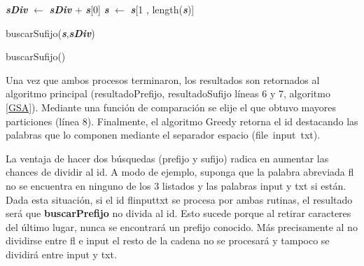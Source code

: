 \begin{function}[b!]
\LinesNumbered%
\BlankLine

\BlankLine
{}
\BlankLine
{}

\textit{\textbf{sDiv}} $\leftarrow$ \textit{\textbf{sDiv}} $+$ \textit{\textbf{s}}[0]
\BlankLine
{}
\textit{\textbf{s}} $\leftarrow$ \textit{\textbf{s}}[1 , length(\textit{\textbf{s}})]

\Return buscarSufijo(\textit{\textbf{s}},\textit{\textbf{sDiv}})

\caption{buscarSufijo()}
\end{function}

Una vez que ambos procesos terminaron, los resultados son retornados al algoritmo principal (\textsf{resultadoPrefijo, resultadoSufijo} líneas 6 y 7, algoritmo \ref{GSA}). Mediante una función de comparación se elije el que obtuvo mayores particiones (línea 8). Finalmente, el algoritmo Greedy retorna el id destacando las palabras que lo componen mediante el separador espacio \mbox{(\textsf{file input txt})}.

La ventaja de hacer dos búsquedas (prefijo y sufijo) radica en aumentar las chances de dividir al id. A modo de ejemplo, suponga que la palabra abreviada \textsf{fl}
no se encuentra en ninguno de los 3 listados y las palabras \textsf{input} y \textsf{txt} si están. Dada esta situación, si el id \textsf{flinputtxt} se procesa por ambas rutinas, el resultado será que \textbf{buscarPrefijo} no divida al id. Esto sucede porque al retirar caracteres del último lugar, nunca se encontrará un prefijo conocido. Más precisamente al no dividirse entre \textsf{fl} e \textsf{input} el resto de la cadena no se procesará y tampoco se dividirá entre \textsf{input} y \textsf{txt}. 

